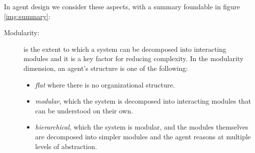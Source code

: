 In agent design we consider these aspects, with a summary foundable in figure \ref{img:summary}:
\begin{description}
    \item [Modularity: ] is the extent to which a system can be decomposed into interacting modules
                         and it is a key factor for reducing complexity.\newline
                         In the modularity dimension, an agent’s structure is one of the following:
                         \begin{itemize}
                            \item \emph{flat} where there is no organizational structure.
                            \item \emph{modular}, which the system is decomposed into interacting modules
                                  that can be understood on their own.
                            \item \emph{hierarchical}, which the system is modular, and the modules themselves are
                                  decomposed into simpler modules and the agent reasons at 
                                  multiple levels of abstraction.
                        \end{itemize}


\end{description}
